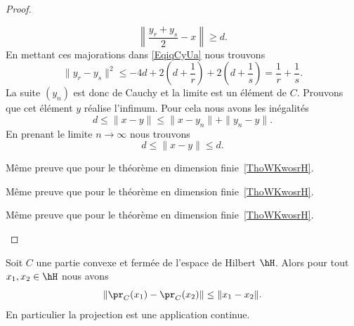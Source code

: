 \begin{proof}
\begin{description}
		      \begin{equation}
			      \left\| \frac{ y_r+y_s }{2}-x \right\| \geq d.
		      \end{equation}
		      En mettant ces majorations dans \eqref{EqiqCyUa} nous trouvons
		      \begin{equation}
			      \| y_r-y_s \|^2\leq -4d+2\left( d+\frac{1}{ r } \right)+2\left( d+\frac{1}{ s } \right)=\frac{1}{ r }+\frac{1}{ s }.
		      \end{equation}
		      La suite \( (y_n)\) est donc de Cauchy et la limite est un élément de \( C\). Prouvons que cet élément \( y\) réalise l'infimum. Pour cela nous avons les inégalités
		      \begin{equation}
			      d\leq \| x-y \|\leq\| x-y_n \|+\| y_n-y \|.
		      \end{equation}
		      En prenant le limite \( n\to\infty\) nous trouvons
		      \begin{equation}
			      d\leq \| x-y \|\leq d.
		      \end{equation}

		\item[Unicité]

		      Même preuve que pour le théorème en dimension finie~\ref{ThoWKwosrH}.

		\item[\ref{ETsfYCSItemi}\( \Rightarrow\)~\ref{ETsfYCSItemii}]

		      Même preuve que pour le théorème en dimension finie~\ref{ThoWKwosrH}.
		\item[\ref{ETsfYCSItemii}\( \Rightarrow\)~\ref{ETsfYCSItemi}]

		      Même preuve que pour le théorème en dimension finie~\ref{ThoWKwosrH}.

	\end{description}
\end{proof}

\begin{proposition}     \label{PropAXJpCe}
	Soit \( C\) une partie convexe et fermée de l'espace de Hilbert \( \hH\). Alors pour tout \( x_1,x_2\in\hH\) nous avons
	\begin{equation}
		\| \pr_C(x_1)-\pr_C(x_2) \|\leq \| x_1-x_2 \|.
	\end{equation}
	En particulier la projection est une application continue.
\end{proposition}

